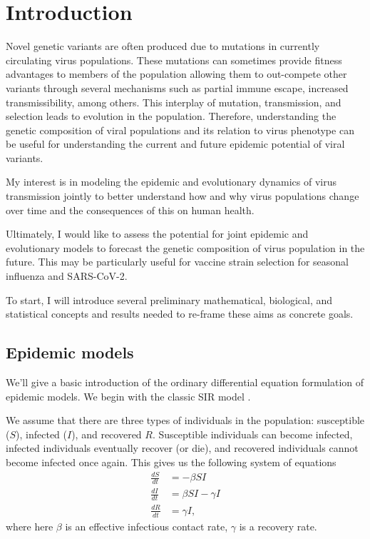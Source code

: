 \chapter {Introduction}

Novel genetic variants are often produced due to mutations in currently circulating virus populations.
These mutations can sometimes provide fitness advantages to members of the population allowing them to out-compete other variants through several mechanisms such as partial immune escape, increased transmissibility, among others.
This interplay of mutation, transmission, and selection leads to evolution in the population.
Therefore, understanding the genetic composition of viral populations and its relation to virus phenotype can be useful for understanding the current and future epidemic potential of viral variants.

My interest is in modeling the epidemic and evolutionary dynamics of virus transmission jointly to better understand how and why virus populations change over time and the consequences of this on human health.

Ultimately, I would like to assess the potential for joint epidemic and evolutionary models to forecast the genetic composition of virus population in the future.
This may be particularly useful for vaccine strain selection for seasonal influenza and SARS-CoV-2.

To start, I will introduce several preliminary mathematical, biological, and statistical concepts and results needed to re-frame these aims as concrete goals.

\section{Epidemic models}

We'll give a basic introduction of the ordinary differential equation formulation of epidemic models. 
We begin with the classic SIR model \cite{KermackMcKendrick1927}.

We assume that there are three types of individuals in the population: susceptible ($S$), infected ($I$), and recovered $R$. 
Susceptible individuals can become infected, infected individuals eventually recover (or die), and recovered individuals cannot become infected once again. 
This gives us the following system of equations
\begin{align}
  \frac{d S}{d t} &= - \beta S I\\ 
  \frac{d I}{d t} &= \beta S I - \gamma I\\
  \frac{d R}{d t} &= \gamma I,
\end{align}
where here $\beta$ is an effective infectious contact rate, $\gamma$ is a recovery rate. 

